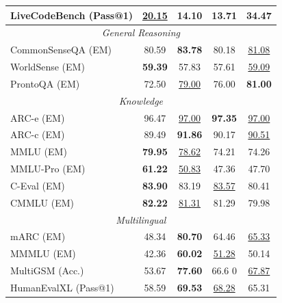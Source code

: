 \documentclass[table]{gtech}
\theoremstyle{definition}
\begin{document}
\begin{table}[h]
{\begin{tabular}{lcccc}
LiveCodeBench (Pass@1) & \underline{20.15} & 14.10 & 13.71 & \textbf{34.47}\\
\midrule
\multicolumn{5}{c}{\textit{General Reasoning}} \\
\midrule
CommonSenseQA (EM) & 80.59 & \textbf{83.78} & 80.18 & \underline{81.08} \\

WorldSense (EM) & \textbf{59.39} & 57.83 & 57.61 & \underline{59.09} \\
ProntoQA (EM) & 72.50 & \underline{79.00} & 76.00 & \textbf{81.00} \\
\midrule
\multicolumn{5}{c}{\textit{Knowledge}} \\
\midrule
ARC-e (EM) & 96.47 & \underline{97.00} & \textbf{97.35} & \underline{97.00} \\
ARC-c (EM) & 89.49 & \textbf{91.86} & 90.17 & \underline{90.51} \\
MMLU (EM) & \textbf{79.95} & \underline{78.62} & 74.21 & 74.26\\
MMLU-Pro (EM) & \textbf{61.22} & \underline{50.83} & 47.36 & 47.70\\
C-Eval (EM) & \textbf{83.90} & 83.19 & \underline{83.57} & 80.41\\
CMMLU (EM) & \textbf{82.22} & \underline{81.31} & 81.29 & 79.98\\
\midrule
\multicolumn{5}{c}{\textit{Multilingual}} \\
\midrule
mARC (EM) & 48.34 & \textbf{80.70} & 64.46 & \underline{65.33} \\
MMMLU (EM) & 42.36  & \textbf{60.02} & \underline{51.28} & 50.14\\
MultiGSM (Acc.) & 53.67 & \textbf{77.60} & 66.6 0& \underline{67.87} \\
HumanEvalXL (Pass@1) & 58.59 & \textbf{69.53} & \underline{68.28}	& 65.31 \\
\bottomrule
\end{tabular}
}
\end{table}
\end{document}
